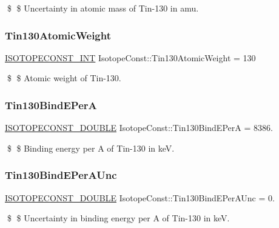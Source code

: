 \$ \$ Uncertainty in atomic mass of Tin-\/130 in amu. \mbox{\label{group___isotope_const-_tin-_sn130_ga861a5021ad8d1208e00734cfc54468ff}} 
\subsubsection{\texorpdfstring{Tin130\+Atomic\+Weight}{Tin130AtomicWeight}}
{\footnotesize\ttfamily \mbox{\hyperlink{group___isotope_const-_macros_ga5f18360b3e99483a35c32d789e62621c}{I\+S\+O\+T\+O\+P\+E\+C\+O\+N\+S\+T\+\_\+\+I\+NT}} Isotope\+Const\+::\+Tin130\+Atomic\+Weight = 130}

\$ \$ Atomic weight of Tin-\/130. \mbox{\label{group___isotope_const-_tin-_sn130_ga14ea6ff1bcd52b1f2eb837e678f23b2e}} 
\subsubsection{\texorpdfstring{Tin130\+Bind\+E\+PerA}{Tin130BindEPerA}}
{\footnotesize\ttfamily \mbox{\hyperlink{group___isotope_const-_macros_ga8f45a7272ce02c0b4c65c44636ed719a}{I\+S\+O\+T\+O\+P\+E\+C\+O\+N\+S\+T\+\_\+\+D\+O\+U\+B\+LE}} Isotope\+Const\+::\+Tin130\+Bind\+E\+PerA = 8386.}

\$ \$ Binding energy per A of Tin-\/130 in keV. \mbox{\label{group___isotope_const-_tin-_sn130_gacfe6540e481c0c93eff45ba079bb5e5c}} 
\subsubsection{\texorpdfstring{Tin130\+Bind\+E\+Per\+A\+Unc}{Tin130BindEPerAUnc}}
{\footnotesize\ttfamily \mbox{\hyperlink{group___isotope_const-_macros_ga8f45a7272ce02c0b4c65c44636ed719a}{I\+S\+O\+T\+O\+P\+E\+C\+O\+N\+S\+T\+\_\+\+D\+O\+U\+B\+LE}} Isotope\+Const\+::\+Tin130\+Bind\+E\+Per\+A\+Unc = 0.}

\$ \$ Uncertainty in binding energy per A of Tin-\/130 in keV. \mbox{\label{group___isotope_const-_tin-_sn130_ga47f64a26d383871e26047f2800381e5c}} 
